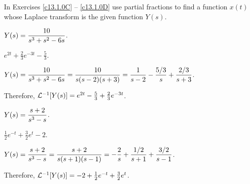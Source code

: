 \documentclass{ximera}
\begin{document}
\TEXER

\noindent In Exercises \ref{c13.1.0C} -- \ref{c13.1.0D} use partial fractions
to find a function $x(t)$ whose Laplace transform is the given function
$Y(s)$.
\begin{exercise} \label{c13.1.0C}
$Y(s) = \displaystyle\frac{10}{s^3+s^2-6s}$.

\begin{solution}
\ans $e^{2t}+\frac{2}{3}e^{-3t}-\frac{5}{3}$.

\soln $Y(s)=\displaystyle\frac{10}{s^3+s^2-6s} = \frac{10}{s(s-2)(s+3)}=
\frac{1}{s-2}-\frac{5/3}{s}+\frac{2/3}{s+3}$.  

Therefore,
${\cal L}^{-1}[Y(s)] = e^{2t}-\frac{5}{3}+\frac{2}{3}e^{-3t}$.


\end{solution}
\end{exercise}
\begin{exercise} \label{c13.1.0D}
$Y(s) = \displaystyle\frac{s+2}{s^3-s}$.

\begin{solution}
\ans $\frac{1}{2}e^{-t} + \frac{3}{2}e^t -2$.

\soln $Y(s) = \displaystyle\frac{s+2}{s^3-s} = \frac{s+2}{s(s+1)(s-1)} =
-\frac{2}{s} + \frac{1/2}{s+1} + \frac{3/2}{s-1}$.

Therefore, ${\cal L}^{-1}[Y(s)] = -2 + \frac{1}{2}e^{-t} + \frac{3}{2}e^t$.


\end{solution}
\end{exercise}
\end{document}
